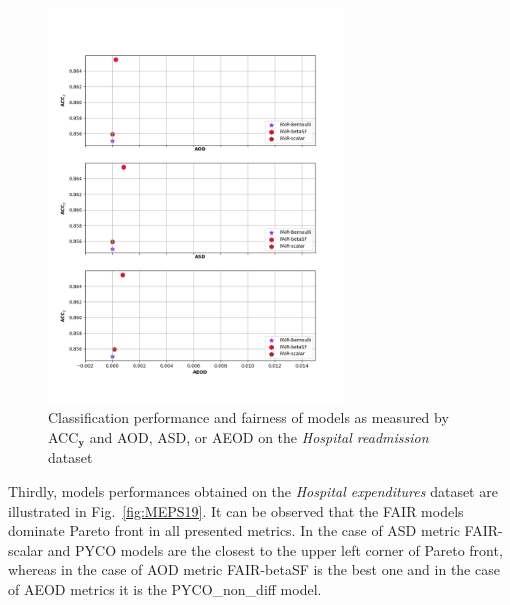 \documentclass[preprint,12pt]{elsarticle}
\begin{document}
\begin{figure}
	\center
	\includegraphics[angle=0, width=0.7\textwidth]{Readmission_ACC.png}
	\captionsetup{justification=centering}
	\caption{Classification performance and fairness of models as measured by ACC$_\mathbf{y}$ and AOD, ASD, or AEOD on the \textit{Hospital readmission} dataset}
	\label{fig:Readmission}
	\vskip -0.2in
\end{figure}

Thirdly, models performances obtained on the \textit{Hospital expenditures} dataset are illustrated in Fig.~\ref{fig:MEPS19}. It can be observed that the FAIR models dominate Pareto front in all presented metrics. In the case of ASD metric FAIR-scalar and PYCO models are the closest to the upper left corner of Pareto front, whereas in the case of AOD metric FAIR-betaSF is the best one and in the case of AEOD metrics it is the PYCO\_non\_diff model. 
\end{document}

